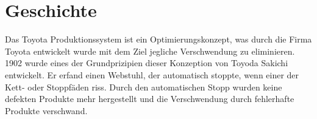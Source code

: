 \documentclass[00_ToyotaProduktionssystem.tex]{subfiles}
\begin{document}
\chapter{Geschichte}
\label{chap:GESCHICHTE}
Das Toyota Produktionssystem ist ein Optimierungskonzept, was durch die Firma Toyota entwickelt wurde mit dem Ziel jegliche Verschwendung zu eliminieren. 1902 wurde eines der Grundprizipien dieser Konzeption von Toyoda Sakichi entwickelt. Er erfand einen Webstuhl, der automatisch stoppte, wenn einer der Kett- oder Stoppfäden riss. Durch den automatischen Stopp wurden keine defekten Produkte mehr hergestellt und die Verschwendung durch fehlerhafte Produkte verschwand. 
\end{document}
